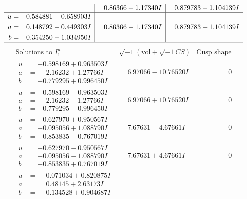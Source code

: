 \documentclass[1p]{elsarticle_modified}
\theoremstyle{definition}
\newcommand{\I}{\sqrt{-1}}
\begin{document}
$$\begin{array}{c|c|c}
 & \phantom{-}0.86366 + 1.17340 I & \phantom{-}0.879783 - 1.104139 I \\ \hline\begin{aligned}
u &= -0.584881 - 0.658903 I \\
a &= \phantom{-}0.148792 - 0.449303 I \\
b &= \phantom{-}0.354250 - 1.034950 I\end{aligned}
 & \phantom{-}0.86366 - 1.17340 I & \phantom{-}0.879783 + 1.104139 I\\
 \hline 
 \end{array}$$\newpage$$\begin{array}{c|c|c}  
\text{Solutions to }I^u_{1}& \I (\text{vol} + \sqrt{-1}CS) & \text{Cusp shape}\\
 \hline 
\begin{aligned}
u &= -0.598169 + 0.963503 I \\
a &= \phantom{-}2.16232 + 1.27766 I \\
b &= -0.779295 + 0.996450 I\end{aligned}
 & \phantom{-}6.97066 - 10.76520 I & \phantom{-0.000000 } 0 \\ \hline\begin{aligned}
u &= -0.598169 - 0.963503 I \\
a &= \phantom{-}2.16232 - 1.27766 I \\
b &= -0.779295 - 0.996450 I\end{aligned}
 & \phantom{-}6.97066 + 10.76520 I & \phantom{-0.000000 } 0 \\ \hline\begin{aligned}
u &= -0.627970 + 0.950567 I \\
a &= -0.095056 + 1.088790 I \\
b &= -0.853835 - 0.767019 I\end{aligned}
 & \phantom{-}7.67631 - 4.67661 I & \phantom{-0.000000 } 0 \\ \hline\begin{aligned}
u &= -0.627970 - 0.950567 I \\
a &= -0.095056 - 1.088790 I \\
b &= -0.853835 + 0.767019 I\end{aligned}
 & \phantom{-}7.67631 + 4.67661 I & \phantom{-0.000000 } 0 \\ \hline\begin{aligned}
u &= \phantom{-}0.071034 + 0.820875 I \\
a &= \phantom{-}0.48145 + 2.63173 I \\
b &= \phantom{-}0.134528 + 0.904687 I\end{aligned}

\end{array}$$
\end{document}

